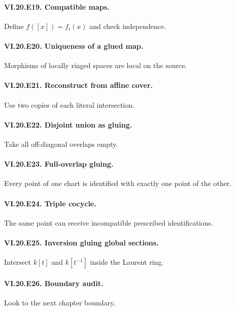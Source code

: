 \paragraph{VI.20.E19. Compatible maps.} Define $f([x])=f_i(x)$ and check independence.

\paragraph{VI.20.E20. Uniqueness of a glued map.} Morphisms of locally ringed spaces are local on the source.

\paragraph{VI.20.E21. Reconstruct from affine cover.} Use two copies of each literal intersection.

\paragraph{VI.20.E22. Disjoint union as gluing.} Take all off-diagonal overlaps empty.

\paragraph{VI.20.E23. Full-overlap gluing.} Every point of one chart is identified with exactly one point of the other.

\paragraph{VI.20.E24. Triple cocycle.} The same point can receive incompatible prescribed identifications.

\paragraph{VI.20.E25. Inversion gluing global sections.} Intersect $k[t]$ and $k[t^{-1}]$ inside the Laurent ring.

\paragraph{VI.20.E26. Boundary audit.} Look to the next chapter boundary.


